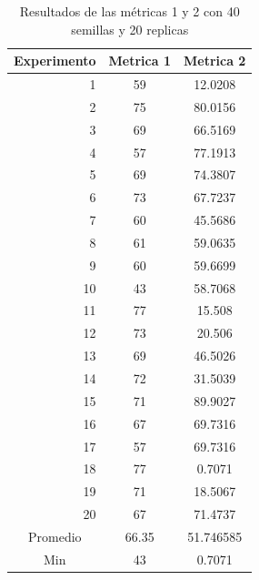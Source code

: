 \documentclass{article}
\begin{document}
\begin{center}
\begin{table}[htbp]
	\centering
	\caption{Resultados  de las métricas 1 y 2 con 40 semillas  y 20 replicas}
	\begin{tabular}{|c|c|c|}
		\hline
		Experimento  & \multicolumn{1}{l|}{Metrica 1} & \multicolumn{1}{p{5.39em}|}{Metrica 2} \\
		\hline
		\multicolumn{1}{|r|}{1} & 59    & 12.0208 \\
		\hline
		\multicolumn{1}{|r|}{2} & 75    & 80.0156 \\
		\hline
		\multicolumn{1}{|r|}{3} & 69    & 66.5169 \\
		\hline
		\multicolumn{1}{|r|}{4} & 57    & 77.1913 \\
		\hline
		\multicolumn{1}{|r|}{5} & 69    & 74.3807 \\
		\hline
		\multicolumn{1}{|r|}{6} & 73    & 67.7237 \\
		\hline
		\multicolumn{1}{|r|}{7} & 60    & 45.5686 \\
		\hline
		\multicolumn{1}{|r|}{8} & 61    & 59.0635 \\
		\hline
		\multicolumn{1}{|r|}{9} & 60    & 59.6699 \\
		\hline
		\multicolumn{1}{|r|}{10} & \cellcolor[rgb]{ .663,  .816,  .557}43 & 58.7068 \\
		\hline
		\multicolumn{1}{|r|}{11} & 77    & 15.508 \\
		\hline
		\multicolumn{1}{|r|}{12} & 73    & 20.506 \\
		\hline
		\multicolumn{1}{|r|}{13} & 69    & 46.5026 \\
		\hline
		\multicolumn{1}{|r|}{14} & 72    & 31.5039 \\
		\hline
		\multicolumn{1}{|r|}{15} & 71    & 89.9027 \\
		\hline
		\multicolumn{1}{|r|}{16} & 67    & 69.7316 \\
		\hline
		\multicolumn{1}{|r|}{17} & 57    & 69.7316 \\
		\hline
		\multicolumn{1}{|r|}{18} & 77    & \cellcolor[rgb]{ .663,  .816,  .557}0.7071 \\
		\hline
		\multicolumn{1}{|r|}{19} & 71    & 18.5067 \\
		\hline
		\multicolumn{1}{|r|}{20} & 67    & 71.4737 \\
		\hline
		Promedio & 66.35 & 51.746585 \\
		\hline
		Min   & 43    & 0.7071 \\
		\hline
	\end{tabular}%
	\label{tab:addlabel}%
\end{table}%

\end{center}
\newpage
\end{document}
